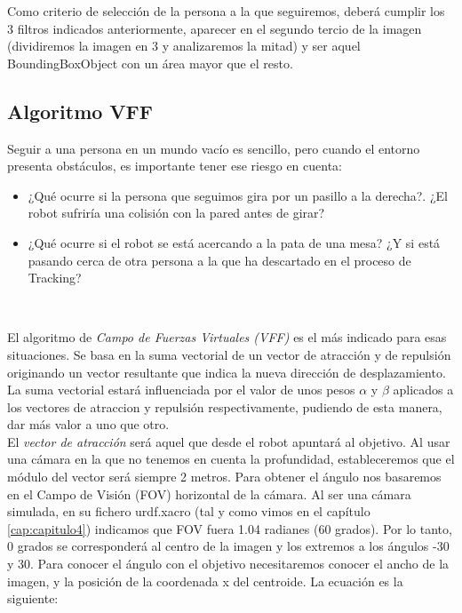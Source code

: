 Como criterio de selección de la persona a la que seguiremos, deberá cumplir los 3 filtros indicados anteriormente, aparecer en el segundo tercio de la imagen (dividiremos la imagen en 3 y analizaremos la mitad) y ser aquel BoundingBoxObject con un área mayor que el resto.\\


\subsection{Algoritmo VFF}
\label{subsec:vff}

Seguir a una persona en un mundo vacío es sencillo, pero cuando el entorno presenta obstáculos, es importante tener ese riesgo en cuenta:\\

\begin{itemize}
	\item ¿Qué ocurre si la persona que seguimos gira por un pasillo a la derecha?. ¿El robot sufriría una colisión con la pared antes de girar?
	\item ¿Qué ocurre si el robot se está acercando a la pata de una mesa? ¿Y si está pasando cerca de otra persona a la que ha descartado en el proceso de Tracking?
\end{itemize}\

El algoritmo de \textit{Campo de Fuerzas Virtuales (VFF)} es el más indicado para esas situaciones. Se basa en la suma vectorial de un vector de atracción y de repulsión originando un vector resultante que indica la nueva dirección de desplazamiento. La suma vectorial estará influenciada por el valor de unos pesos $\alpha$ y $\beta$ aplicados a los vectores de atraccion y repulsión respectivamente, pudiendo de esta manera, dar más valor a uno que otro.\\

El \textit{vector de atracción} será aquel que desde el robot apuntará al objetivo. Al usar una cámara en la que no tenemos en cuenta la profundidad, estableceremos que el módulo del vector será siempre 2 metros. Para obtener el ángulo nos basaremos en el Campo de Visión (FOV) horizontal de la cámara. Al ser una cámara simulada, en su fichero urdf.xacro (tal y como vimos en el capítulo \ref{cap:capitulo4}) indicamos que FOV fuera 1.04 radianes (60 grados). Por lo tanto, 0 grados se corresponderá al centro de la imagen y los extremos a los ángulos -30 y 30. Para conocer el ángulo con el objetivo necesitaremos conocer el ancho de la imagen, y la posición de la coordenada x del centroide. La ecuación es la siguiente:

